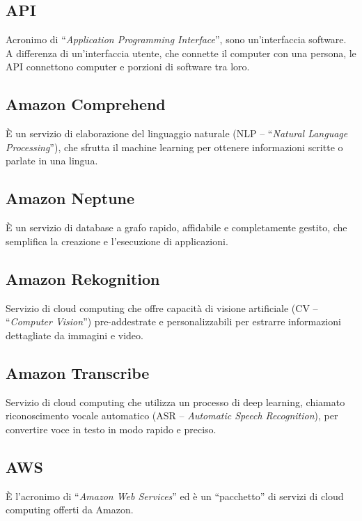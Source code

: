\subsection{API}
Acronimo di “\textit{Application Programming Interface}”, sono un’interfaccia software. A differenza di un’interfaccia utente, che connette il computer con una persona, le API connettono computer e porzioni di software tra loro.

\subsection{Amazon Comprehend}
È un servizio di elaborazione del linguaggio naturale (NLP – “\textit{Natural Language Processing}”), che sfrutta il machine learning per ottenere informazioni scritte o parlate in una lingua. 

\subsection{Amazon Neptune}
È un servizio di database a grafo rapido, affidabile e completamente gestito, che semplifica la creazione e l’esecuzione di applicazioni. 

\subsection{Amazon Rekognition}
Servizio di cloud computing che offre capacità di visione artificiale (CV – “\textit{Computer Vision}”) pre-addestrate e personalizzabili per estrarre informazioni dettagliate da immagini e video. 

\subsection{Amazon Transcribe}

Servizio di cloud computing che utilizza un processo di deep learning, chiamato riconoscimento vocale automatico (ASR – \textit{Automatic Speech Recognition}), per convertire voce in testo in modo rapido e preciso.

\subsection{AWS}
È l’acronimo di “\textit{Amazon Web Services}” ed è un “pacchetto” di servizi di cloud computing offerti da Amazon. 

\clearpage 